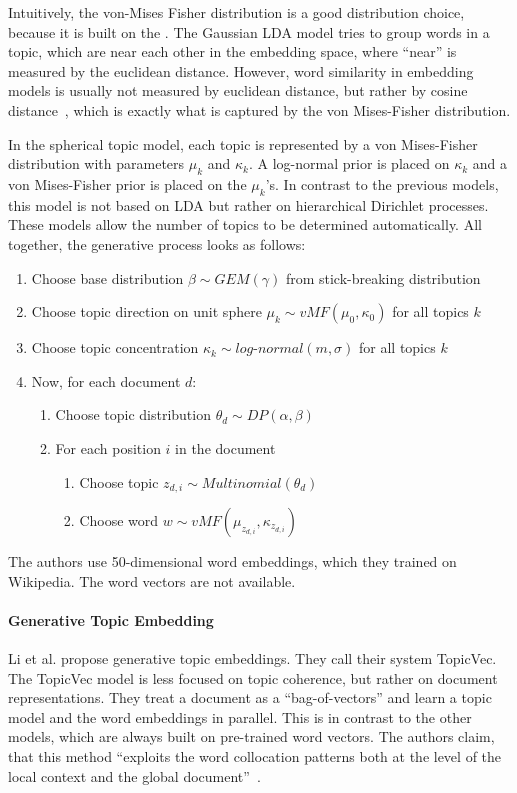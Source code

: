 \documentclass[
        a4paper,
        titlepage,
        twoside,
        parskip
        ]{scrbook}
\theoremstyle{break}
\begin{document}
Intuitively, the von-Mises Fisher distribution is a good distribution choice, because it is built on the .
The Gaussian LDA model tries to group words in a topic, which are near each other in the embedding space, where ``near'' is measured by the euclidean distance.
However, word similarity in embedding models is usually not measured by euclidean distance, but rather by cosine distance~\cite{Mikolov2013a}, which is exactly what is captured by the von Mises-Fisher distribution.

In the spherical topic model, each topic is represented by a von Mises-Fisher distribution with parameters $\mu_k$ and $\kappa_k$.
A log-normal prior is placed on $\kappa_k$ and a von Mises-Fisher prior is placed on the $\mu_k$'s.
In contrast to the previous models, this model is not based on LDA but rather on hierarchical Dirichlet processes.
These models allow the number of topics to be determined automatically.
All together, the generative process looks as follows:
\begin{enumerate}
    \item Choose base distribution $\beta \sim GEM(\gamma)$ from stick-breaking distribution
    \item Choose topic direction on unit sphere $\mu_k \sim vMF(\mu_0, \kappa_0)$ for all topics $k$
    \item Choose topic concentration $\kappa_k \sim log\mbox{-}normal(m, \sigma)$ for all topics $k$
    \item Now, for each document $d$:
    \begin{enumerate}
        \item Choose topic distribution $\theta_d \sim DP(\alpha, \beta)$
        \item For each position $i$ in the document
        \begin{enumerate}
            \item Choose topic $z_{d,i} \sim Multinomial(\theta_d)$
            \item Choose word $w \sim vMF(\mu_{z_{d,i}}, \kappa_{z_{d,i}})$
        \end{enumerate}
    \end{enumerate}
\end{enumerate}

The authors use 50-dimensional word embeddings, which they trained on Wikipedia.
The word vectors are not available.

\paragraph{Generative Topic Embedding}
Li et al.\cite{Li2016} propose generative topic embeddings.
They call their system TopicVec.
The TopicVec model is less focused on topic coherence, but rather on document representations.
They treat a document as a ``bag-of-vectors'' and learn a topic model and the word embeddings in parallel.
This is in contrast to the other models, which are always built on pre-trained word vectors.
The authors claim, that this method ``exploits the word collocation patterns both at the level of the local context and the global document''~\cite{Li2016}.
\end{document}
